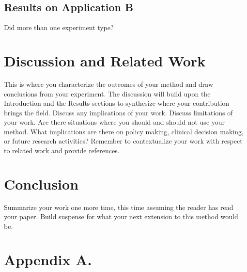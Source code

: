 \documentclass[twoside,11pt]{article}
\begin{document}
\subsection{Results on Application B}

Did more than one experiment type?

\section{Discussion and Related Work}

This is where you characterize the outcomes of your method and draw conclusions from your experiment.
The discussion will build upon the Introduction and the Results sections to synthesize where your contribution brings the field. Discuss any implications of your work.
Discuss limitations of your work.
Are there situations where you should and should not use your method.
What implications are there on policy making, clinical decision making, or future research activities?
Remember to contextualize your work with respect to related work and provide references.

\section{Conclusion}
Summarize your work one more time, this time assuming the reader has read your paper.
Build suspense for what your next extension to this method would be.




\appendix
\section*{Appendix A.}\label{append}
\end{document}
